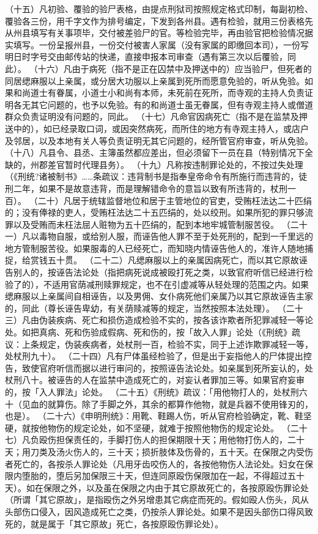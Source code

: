 \documentclass[12pt,UTF8]{ctexbook}
\begin{document}
（十五）凡初验、覆验的验尸表格，由提点刑狱司按照规定格式印制，每副初检、覆验各三份，用千字文作为排号编定，下发到各州县。遇有检验，就用三份表格先从州县填写有关事项毕，交付被差验尸的官。等检验完毕，再由验官把检验情况据实填写。一份呈报州县，一份交付被害人家属（没有家属的即缴回本司），一份写明日时字号交由邮传站的快递，直接申报本司审查（遇有第三次以后覆验，同此）。
（十六）凡由于病死（指不是正在囚禁中及押送中的）应当验尸，但死者的同居缌麻服以上亲属，或分居大功服以上亲属到死所而愿意免验的，听从免验。如果和尚道士有眷属，小道士小和尚有本师，未死前在死所，而寺观的主持人负责证明各无其它问题的，也予以免验。有的和尚道士虽无眷属，但有寺观主持人或僧道群众负责证明没有问题的，同此。
（十七）凡命官因病死亡（指不是在监禁及押送中的），如已经录取口词，或因突然病死，而所住的地方有寺观主持人，或店户及邻居，以及本地有关人等负责证明无其它问题的，经所管官府审查，听从免验。
（十八）凡县令、县丞、主簿虽然都应差出，但必须留下一员在县（特别情况下全缺的，州郡差官暂时代理县务）。
（十九）凡称按违制罪论处的，不按过失处理（《刑统?诸被制书》……条疏议：违背制书是指奉皇帝命令有所施行而违背的，徒刑二年，如果不是故意违背，而是理解错命令的意旨以致有所违背的，杖刑一百）。
（二十）凡居于统辖监督地位和居于主管地位的官吏，受贿枉法达二十匹绢的；没有俸禄的吏人，受贿枉法达二十五匹绢的，处以绞刑。如果所犯的罪只够流罪以及受贿而未枉法屈人赃物为五十匹绢的，配到本地牢城管制服苦役。
（二十一）凡以毒物自服，或给别人服，而诬告他人罪不至于处死刑的，配到一千里远的地方管制服苦役。如果服毒的人已经死亡，而知晓内情诬告他人的，准许人随地捕捉，给赏钱五十贯。
（二十二）凡缌麻服以上的亲属因病死亡，而以其它原故诬告别人的，按诬告法论处（指把病死说成被殴打死之类，以致官府听信已经进行检验了的），不适用官荫减刑赎罪规定，也不在引虚减等从轻处理的范围之内。如果缌麻服以上亲属间自相诬告，以及男佣、女仆病死他们亲属乃以其它原故诬告主家的，同此（尊长诬告卑幼，有关荫赎减等的规定，当然按照本法处理）。
（二十三）凡由伪装疾病、死亡和损伤造成检验不实的，按各该诈欺者所犯罪减轻一等论处。如把真病、死和伤验成假病、死和伤的，按「故入人罪」论处（《刑统》疏议：上条规定，伪装疾病者，处杖刑一百，检验不实，同于上述诈欺罪减轻一等，处杖刑九十）。
（二十四）凡有尸体虽经检验了，但是出于妄指他人的尸体提出控告，致使官府听信而据以进行审问的，按照诬告法论处。如亲属到死所妄认的，处杖刑八十。被诬告的人在监禁中造成死亡的，对妄认者罪加三等。如果官府妄审的，按「入人罪法」论处。
（二十五）《刑统》疏议：「用他物打人的，处杖刑六十（见血的就算伤。除了手脚之外，其余的都算作他物，就是兵器不使用锋刃的，也是）。
（二十六）《申明刑统》：用靴、鞋踢人伤，听从官府检验确定，靴、鞋坚硬，就按他物伤的规定论处，如不坚硬，就难于按照他物伤的规定论处。
（二十七）凡负殴伤担保责任的，手脚打伤人的担保期限十天；用他物打伤人的，二十天；用刀类及汤火伤人的，三十天；损折肢体及伤骨的，五十天。在保限之内受伤者死亡的，各按杀人罪论处（凡用牙齿咬伤人的，各按他物伤人法论处。妇女在保限内堕胎的，堕后另加保限三十天，但连同原殴伤保限加在一起，不得超过五十天）。如在保限之外，以及虽在保限之内由于其它原故死亡的，各按原殴伤罪论处（所谓「其它原故」，是指殴伤之外另增患其它病症而死的。假如殴人伤头，风从头部伤口侵入，因风造成死亡之类，仍按杀人罪论处。如果不是因头部伤口得风致死的，就是属于「其它原故」死亡，各按原殴伤罪论处）。
\end{document}
